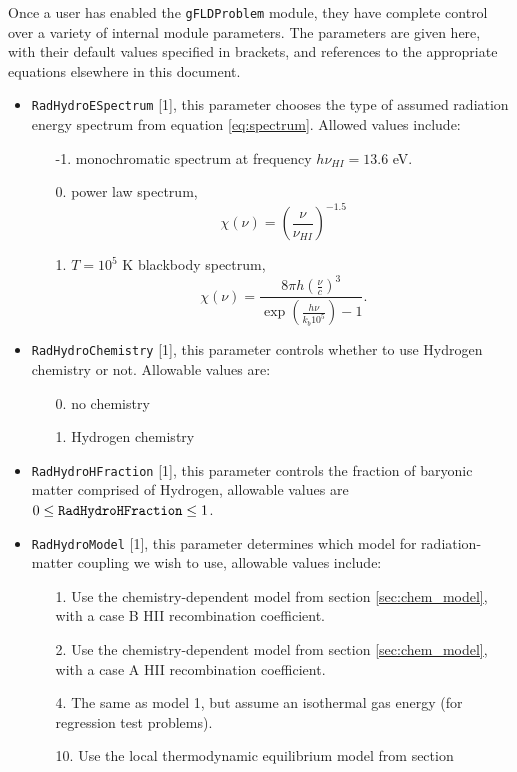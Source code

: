 \documentclass[letterpaper,10pt]{article}
\renewcommand{\(}{\left(}
\renewcommand{\)}{\right)}
\begin{document}
Once a user has enabled the {\tt gFLDProblem} module, they have
complete control over a variety of internal module parameters.  The
parameters are given here, with their default values specified in
brackets, and references to the appropriate equations elsewhere in
this document. 
\begin{itemize}
\item {\tt RadHydroESpectrum} [1], this parameter chooses the type of
  assumed radiation energy spectrum from equation \eqref{eq:spectrum}.
  Allowed values include:
  \begin{itemize}
  \item[-1.] monochromatic spectrum at frequency $h\nu_{HI} = 13.6$ eV.
  \item[0.] power law spectrum,
    \[
      \chi(\nu) = \left(\frac{\nu}{\nu_{HI}}\right)^{-1.5}
    \]
  \item[1.] $T=10^5$ K blackbody spectrum, 
    \[
       \chi(\nu) = \frac{8 \pi h
         \left(\frac{\nu}{c}\right)^3}{\exp\left(\frac{h\nu}{k_b 10^5}\right)-1}.
    \]
  \end{itemize}
\item {\tt RadHydroChemistry} [1], this parameter controls whether to
  use Hydrogen chemistry or not.  Allowable values are:
  \begin{itemize}
  \item[0.] no chemistry
  \item[1.] Hydrogen chemistry
  \end{itemize}
\item {\tt RadHydroHFraction} [1], this parameter controls the
  fraction of baryonic matter comprised of Hydrogen, allowable
  values are $0 \le {\tt RadHydroHFraction} \le 1$.
\item {\tt RadHydroModel} [1], this parameter determines which model
  for radiation-matter coupling we wish to use, allowable values
  include:
  \begin{itemize}
  \item[1.] Use the chemistry-dependent model from section
    \ref{sec:chem_model}, with a case B HII recombination coefficient.
  \item[2.] Use the chemistry-dependent model from section
    \ref{sec:chem_model}, with a case A HII recombination coefficient.
  \item[4.] The same as model 1, but assume an isothermal gas energy
    (for regression test problems).
  \item[10.] Use the local thermodynamic equilibrium model from section

\end{itemize}
\end{itemize}
\end{document}
